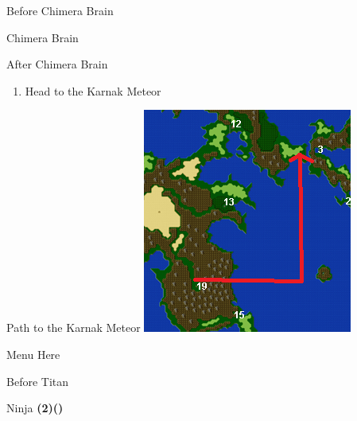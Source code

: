 \begin{paracol}{2}
\begin{steproute}{Before Chimera Brain}
\end{steproute}

\switchcolumn*
\begin{boss}{Chimera Brain}
	\varwb
	\begin{round}{1}
		\lenna \rightCommand{\tame}
        \faris \leftCommand{\gilToss}
        \bartz \leftCommand{\gilToss}
    \end{round}
	\varwe
\end{boss}

\switchcolumn
\begin{steproute}{After Chimera Brain}
\end{steproute}

\switchcolumn*
\newpage
\begin{enumerate}[resume]
    \item Head to the Karnak Meteor
\end{enumerate}

\switchcolumn
\begin{misc}{Path to the Karnak Meteor}
    \includegraphics[scale=0.532]{../Graphics/Maps/10. To Karnak Meteor.png}
\end{misc}

\begin{misc}{Menu Here}
\end{misc}

\switchcolumn
\vspace{3.5cm}
\begin{menu}{Before Titan}
    \varwb
    \begin{jobMenu}
        \lenna Ninja \textbf{(2\pointLeft)(\pointDown)} \ability{!\black}
    \end{jobMenu}
    \varwe
\end{menu}


\end{paracol}
